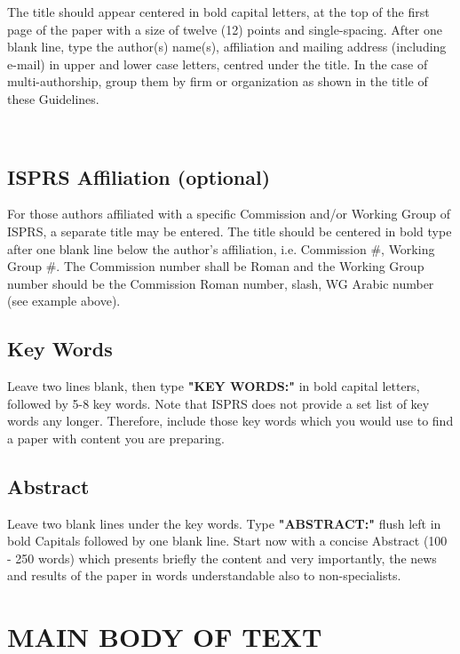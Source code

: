 \documentclass{isprs}
\begin{document}
The title should appear centered in bold capital letters, at the top of the 
first page of the paper with a size of twelve (12) points and single-spacing. 
After one blank line, type the author(s) name(s), affiliation and mailing address 
(including e-mail) in upper and lower case letters, centred under the title. In the 
case of multi-authorship, group them by firm or organization as shown in the title 
of these Guidelines. 

~ %

\subsection{ISPRS Affiliation (optional)}\label{sec:ISPRS Affiliation (optional)}

For those authors affiliated with a specific Commission and/or Working Group of 
ISPRS, a separate title may be entered. The title should be centered in bold type 
after one blank line below the author’s affiliation, i.e. Commission \#, Working Group \#. 
The Commission number shall be Roman and the Working Group number should be the Commission 
Roman number, slash, WG Arabic number (see example above).


\subsection{Key Words}\label{sec:Key Words}

Leave two lines blank, then type \textbf{"KEY WORDS:"}
in bold capital letters, followed by 5-8 key words. Note that ISPRS does not provide a set 
list of key words any longer. Therefore, include those key words which you would 
use to find a paper with content you are preparing.

\subsection{Abstract}\label{sec:Abstract}

Leave two blank lines under the key words. Type \textbf{"ABSTRACT:"}
flush left in bold Capitals followed by one blank line. Start now
with a concise Abstract (100 - 250 words) which presents briefly the
content and very importantly, the news and results of the paper in
words understandable also to non-specialists. 




\section{MAIN BODY OF TEXT}\label{sec:MAIN BODY OF TEXT}
\end{document}
